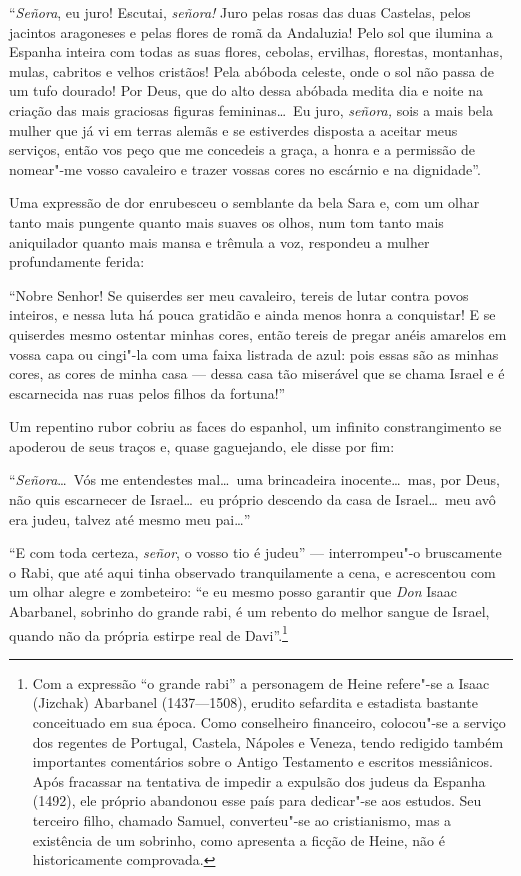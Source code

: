 ``\textit{Señora}, eu juro! Escutai, \textit{señora!} Juro pelas rosas
das duas Castelas, pelos jacintos aragoneses e pelas flores de romã da
Andaluzia! Pelo sol que ilumina a Espanha inteira com todas as suas
flores, cebolas, ervilhas, florestas, montanhas, mulas, cabritos e
velhos cristãos! Pela abóboda celeste, onde o sol não passa de um tufo
dourado! Por Deus, que do alto dessa abóbada medita dia e noite na
criação das mais graciosas figuras femininas\ldots\ Eu juro,
\textit{señora,} sois a mais bela mulher que já vi em terras alemãs e
se estiverdes disposta a aceitar meus serviços, então vos peço que me
concedeis a graça, a honra e a permissão de nomear"-me vosso cavaleiro
e trazer vossas cores no escárnio e na dignidade''.

Uma expressão de dor enrubesceu o semblante da bela Sara e, com um olhar
tanto mais pungente quanto mais suaves os olhos, num tom tanto mais
aniquilador quanto mais mansa e trêmula a voz, respondeu a mulher
profundamente ferida:

``Nobre Senhor! Se quiserdes ser meu cavaleiro, tereis de lutar contra
povos inteiros, e nessa luta há pouca gratidão e ainda menos honra a
conquistar! E se quiserdes mesmo ostentar minhas cores, então tereis de
pregar anéis amarelos em vossa capa ou cingi"-la com uma faixa
listrada de azul: pois essas são as minhas cores, as cores de minha
casa --- dessa casa tão miserável que se chama Israel e é escarnecida nas
ruas pelos filhos da fortuna!''

Um repentino rubor cobriu as faces do espanhol, um infinito
constrangimento se apoderou de seus traços e, quase gaguejando, ele
disse por fim:

``\textit{Señora}\ldots\ Vós me entendestes mal\ldots\ uma brincadeira
inocente\ldots\ mas, por Deus, não quis escarnecer de Israel\ldots\ eu próprio
descendo da casa de Israel\ldots\ meu avô era judeu, talvez até mesmo meu
pai\ldots''

``E com toda certeza, \textit{señor}, o vosso tio é judeu'' ---
interrompeu"-o bruscamente o Rabi, que até aqui tinha observado
tranquilamente a cena, e acrescentou com um olhar alegre e zombeteiro:
``e eu mesmo posso garantir que \textit{Don} Isaac Abarbanel, sobrinho
do grande rabi, é um rebento do melhor sangue de Israel, quando não da
própria estirpe real de
Davi''.\footnote{ Com a
expressão ``o grande rabi'' a personagem de Heine refere"-se a Isaac
(Jizchak) Abarbanel (1437---1508), erudito sefardita e estadista
bastante conceituado em sua época. Como conselheiro financeiro,
colocou"-se a serviço dos regentes de Portugal, Castela, Nápoles e
Veneza, tendo redigido também importantes comentários sobre o Antigo
Testamento e escritos messiânicos. Após fracassar na tentativa de
impedir a expulsão dos judeus da Espanha (1492), ele próprio abandonou
esse país para dedicar"-se aos estudos. Seu terceiro filho, chamado
Samuel, converteu"-se ao cristianismo, mas a existência de um
sobrinho, como apresenta a ficção de Heine, não é historicamente
comprovada.}


